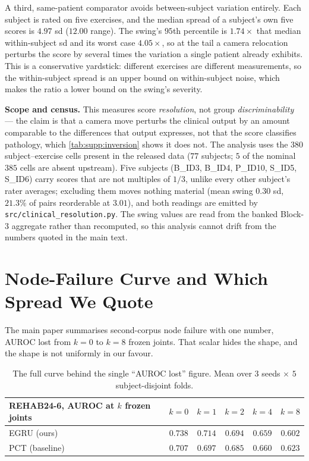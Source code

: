 \documentclass[10pt,twocolumn,letterpaper]{article}
\begin{document}
A third, same-patient comparator avoids between-subject variation entirely. Each subject is rated on
five exercises, and the median spread of a subject's own five scores is $4.97$ sd ($12.00$ range). The
swing's $95$th percentile is $1.74\times$ that median within-subject sd and its worst case $4.05\times$,
so at the tail a camera relocation perturbs the score by several times the variation a single patient
already exhibits. This is a conservative yardstick: different exercises are different measurements, so
the within-subject spread is an upper bound on within-subject noise, which makes the ratio a lower
bound on the swing's severity.

\textbf{Scope and census.} This measures score \emph{resolution}, not group \emph{discriminability} ---
the claim is that a camera move perturbs the clinical output by an amount comparable to the differences
that output expresses, not that the score classifies pathology, which \cref{tab:supp:inversion} shows it
does not. The analysis uses the $380$ subject--exercise cells present in the released data ($77$
subjects; $5$ of the nominal $385$ cells are absent upstream). Five subjects (B\_ID3, B\_ID4, P\_ID10,
S\_ID5, S\_ID6) carry scores that are not multiples of $1/3$, unlike every other subject's rater
averages; excluding them moves nothing material (mean swing $0.30$ sd, $21.3\%$ of pairs reorderable at
$3.01$), and both readings are emitted by \texttt{src/clinical\_resolution.py}. The swing values are
read from the banked Block-3 aggregate rather than recomputed, so this analysis cannot drift from the
numbers quoted in the main text.

\section{Node-Failure Curve and Which Spread We Quote}\label{sec:supp:nodefail}
The main paper summarises second-corpus node failure with one number, AUROC lost from $k{=}0$ to
$k{=}8$ frozen joints. That scalar hides the shape, and the shape is not uniformly in our favour.

\begin{table}[h]
\centering\small
\setlength{\tabcolsep}{5pt}
\begin{tabular}{lccccc}
\toprule
REHAB24-6, AUROC at $k$ frozen joints & $k{=}0$ & $k{=}1$ & $k{=}2$ & $k{=}4$ & $k{=}8$ \\
\midrule
EGRU (ours)    & $0.738$ & $0.714$ & $0.694$ & $0.659$ & $0.602$ \\
PCT (baseline) & $0.707$ & $0.697$ & $0.685$ & $0.660$ & $0.623$ \\
\bottomrule
\end{tabular}
\caption{The full curve behind the single ``AUROC lost'' figure. Mean over $3$ seeds $\times$ $5$
subject-disjoint folds.}
\label{tab:supp:nfcurve}
\end{table}
\end{document}
